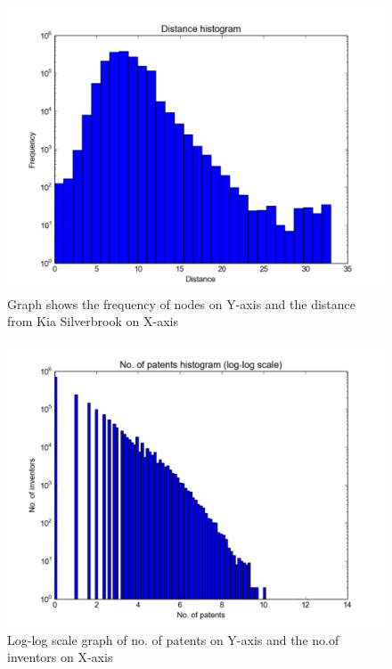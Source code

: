 \begin{figure}[t]
  \includegraphics[scale=0.425]{figure/silver_brook_distance.pdf}
  \caption{\scriptsize Graph shows the frequency of nodes on Y-axis and the distance from
Kia Silverbrook on X-axis }
\label{fig:distance}
\end{figure}

\begin{figure}
  \includegraphics[scale=0.425]{figure/silver_log_log.pdf}
  \caption{\scriptsize Log-log scale graph of no. of patents on Y-axis and the no.of inventors on X-axis}
\label{fig:patent}	
\end{figure}

